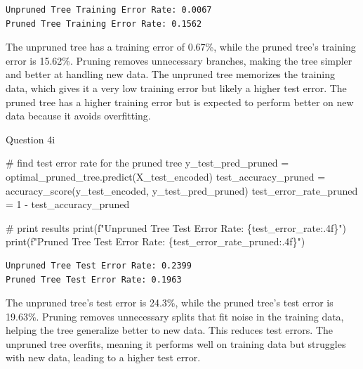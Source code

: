 \documentclass[
  letterpaper,
  DIV=11,
  numbers=noendperiod]{scrartcl}
\newenvironment{Shaded}{\begin{snugshade}}{\end{snugshade}}
\newcommand{\BuiltInTok}[1]{\textcolor[rgb]{0.00,0.23,0.31}{#1}}
\newcommand{\CommentTok}[1]{\textcolor[rgb]{0.37,0.37,0.37}{#1}}
\newcommand{\DecValTok}[1]{\textcolor[rgb]{0.68,0.00,0.00}{#1}}
\newcommand{\NormalTok}[1]{\textcolor[rgb]{0.00,0.23,0.31}{#1}}
\newcommand{\OperatorTok}[1]{\textcolor[rgb]{0.37,0.37,0.37}{#1}}
\newcommand{\SpecialCharTok}[1]{\textcolor[rgb]{0.37,0.37,0.37}{#1}}
\newcommand{\SpecialStringTok}[1]{\textcolor[rgb]{0.13,0.47,0.30}{#1}}
\begin{document}
\begin{verbatim}
Unpruned Tree Training Error Rate: 0.0067
Pruned Tree Training Error Rate: 0.1562
\end{verbatim}

The unpruned tree has a training error of 0.67\%, while the pruned
tree's training error is 15.62\%. Pruning removes unnecessary branches,
making the tree simpler and better at handling new data. The unpruned
tree memorizes the training data, which gives it a very low training
error but likely a higher test error. The pruned tree has a higher
training error but is expected to perform better on new data because it
avoids overfitting.

Question 4i

\begin{Shaded}
\begin{Highlighting}[]
\CommentTok{\# find test error rate for the pruned tree}
\NormalTok{y\_test\_pred\_pruned }\OperatorTok{=}\NormalTok{ optimal\_pruned\_tree.predict(X\_test\_encoded)}
\NormalTok{test\_accuracy\_pruned }\OperatorTok{=}\NormalTok{ accuracy\_score(y\_test\_encoded, y\_test\_pred\_pruned)}
\NormalTok{test\_error\_rate\_pruned }\OperatorTok{=} \DecValTok{1} \OperatorTok{{-}}\NormalTok{ test\_accuracy\_pruned}

\CommentTok{\# print results}
\BuiltInTok{print}\NormalTok{(}\SpecialStringTok{f"Unpruned Tree Test Error Rate: }\SpecialCharTok{\{}\NormalTok{test\_error\_rate}\SpecialCharTok{:.4f\}}\SpecialStringTok{"}\NormalTok{)}
\BuiltInTok{print}\NormalTok{(}\SpecialStringTok{f"Pruned Tree Test Error Rate: }\SpecialCharTok{\{}\NormalTok{test\_error\_rate\_pruned}\SpecialCharTok{:.4f\}}\SpecialStringTok{"}\NormalTok{)}
\end{Highlighting}
\end{Shaded}

\begin{verbatim}
Unpruned Tree Test Error Rate: 0.2399
Pruned Tree Test Error Rate: 0.1963
\end{verbatim}

The unpruned tree's test error is 24.3\%, while the pruned tree's test
error is 19.63\%. Pruning removes unnecessary splits that fit noise in
the training data, helping the tree generalize better to new data. This
reduces test errors. The unpruned tree overfits, meaning it performs
well on training data but struggles with new data, leading to a higher
test error.
\end{document}
